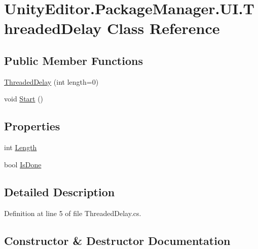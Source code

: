 \hypertarget{class_unity_editor_1_1_package_manager_1_1_u_i_1_1_threaded_delay}{}\section{Unity\+Editor.\+Package\+Manager.\+U\+I.\+Threaded\+Delay Class Reference}
\label{class_unity_editor_1_1_package_manager_1_1_u_i_1_1_threaded_delay}
\subsection*{Public Member Functions}
\begin{DoxyCompactItemize}
\item 
\mbox{\hyperlink{class_unity_editor_1_1_package_manager_1_1_u_i_1_1_threaded_delay_a7b4d360d8efb452b9fc6333985c513bf}{Threaded\+Delay}} (int length=0)
\item 
void \mbox{\hyperlink{class_unity_editor_1_1_package_manager_1_1_u_i_1_1_threaded_delay_a380a324e01afc8c58f59d7883eac6c66}{Start}} ()
\end{DoxyCompactItemize}
\subsection*{Properties}
\begin{DoxyCompactItemize}
\item 
int \mbox{\hyperlink{class_unity_editor_1_1_package_manager_1_1_u_i_1_1_threaded_delay_a13ad6e3fbdb6a07ad15826fc346d3fe4}{Length}}
\item 
bool \mbox{\hyperlink{class_unity_editor_1_1_package_manager_1_1_u_i_1_1_threaded_delay_afdfca2a4da7c8d6df395e77cc85bfc29}{Is\+Done}}
\end{DoxyCompactItemize}


\subsection{Detailed Description}


Definition at line 5 of file Threaded\+Delay.\+cs.



\subsection{Constructor \& Destructor Documentation}
\mbox{\label{class_unity_editor_1_1_package_manager_1_1_u_i_1_1_threaded_delay_a7b4d360d8efb452b9fc6333985c513bf}} 
